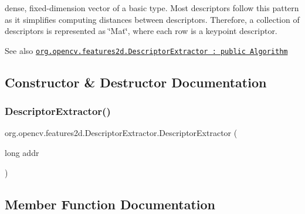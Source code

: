 dense, fixed-\/dimension vector of a basic type. Most descriptors follow this pattern as it simplifies computing distances between descriptors. Therefore, a collection of descriptors is represented as \char`\"{}\+Mat\char`\"{}, where each row is a keypoint descriptor.

\begin{DoxySeeAlso}{See also}
\href{http://docs.opencv.org/modules/features2d/doc/common_interfaces_of_descriptor_extractors.html#descriptorextractor}{\tt org.\+opencv.\+features2d.\+Descriptor\+Extractor \+: public Algorithm} 
\end{DoxySeeAlso}


\subsection{Constructor \& Destructor Documentation}
\mbox{\label{classorg_1_1opencv_1_1features2d_1_1_descriptor_extractor_a59eb1d9c4273594cc3d925e3ec3ed70f}} 
\subsubsection{\texorpdfstring{Descriptor\+Extractor()}{DescriptorExtractor()}}
{\footnotesize\ttfamily org.\+opencv.\+features2d.\+Descriptor\+Extractor.\+Descriptor\+Extractor (\begin{DoxyParamCaption}\item[{long}]{addr }\end{DoxyParamCaption})\hspace{0.3cm}{\ttfamily [protected]}}



\subsection{Member Function Documentation}
\mbox{\label{classorg_1_1opencv_1_1features2d_1_1_descriptor_extractor_afed8df31872201e6e6e001a1e8be8df9}} 
